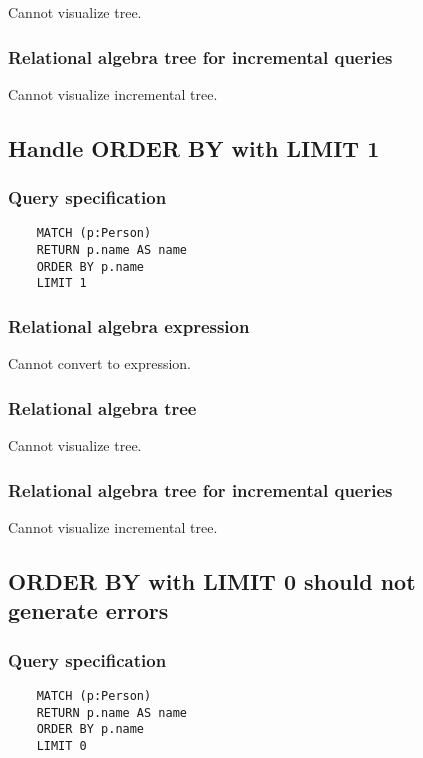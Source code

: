 	Cannot visualize tree.

	\subsubsection*{Relational algebra tree for incremental queries}

	Cannot visualize incremental tree.
	\subsection{Handle ORDER BY with LIMIT 1}

	\subsubsection*{Query specification}

	\begin{lstlisting}
	MATCH (p:Person)
	RETURN p.name AS name
	ORDER BY p.name
	LIMIT 1
	\end{lstlisting}


	\subsubsection*{Relational algebra expression}

	Cannot convert to expression.

	\subsubsection*{Relational algebra tree}

	Cannot visualize tree.

	\subsubsection*{Relational algebra tree for incremental queries}

	Cannot visualize incremental tree.
	\subsection{ORDER BY with LIMIT 0 should not generate errors}

	\subsubsection*{Query specification}

	\begin{lstlisting}
	MATCH (p:Person)
	RETURN p.name AS name
	ORDER BY p.name
	LIMIT 0
	\end{lstlisting}


